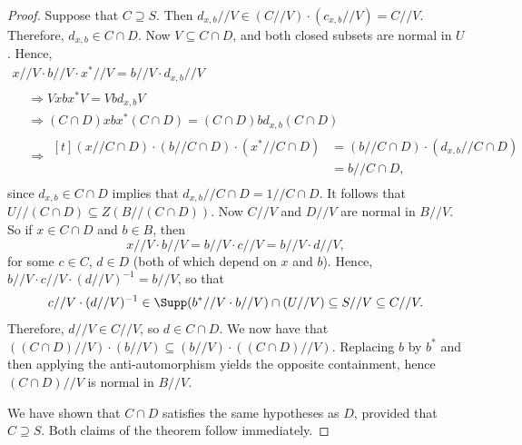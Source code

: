 \begin{proof}
Suppose that $C \supseteq S$. Then $d_{x,b}//V \in (C//V)\cdot
(c_{x,b}//V) 
= C//V$. Therefore, $d_{x,b} \in C\cap D$. Now $V \subseteq C\cap D$,
and both closed subsets are normal in $U$. Hence,
\begin{multline*}
x//V\cdot b//V\cdot x^*//V = b//V\cdot d_{x,b}//V\\ 
\begin{aligned}
&\Rightarrow 
Vxbx^*V = Vbd_{x,b}V
\\
 &\Rightarrow (C\cap D)xbx^*(C\cap D) = (C\cap
D)bd_{x,b}(C\cap D)
\\
& \Rightarrow\begin{aligned}[t](x//C\cap D)\cdot (b//C\cap D)\cdot
(x^*//C\cap D) &= (b//C\cap D)\cdot (d_{x,b}//C\cap D)\\
 &= b//C\cap D,
 \end{aligned}
\end{aligned}
\end{multline*}
since $d_{x,b} \in C\cap D$ implies that $d_{x,b}//C\cap D = 1//C\cap
D$. It follows that $U//(C\cap D) \subseteq Z(B//(C\cap D))$. 
Now 
 $C//V$ and $D//V$ are normal in $B//V$. 
 So if $x \in C\cap
D$ and $b \in B$, then 
\[
x//V\cdot b//V = b//V\cdot c//V = b//V\cdot d//V,
\]
for some $c \in C$, $d \in D$ (both of which depend on $x$ and $b$).
Hence, $b//V\cdot c//V\cdot (d//V)^{-1} = b//V$, so that 
\[
 c//V\cdot (d//V)^{-1} \in \Supp (b^*//V\cdot b//V)\cap (U//V) \subseteq S//V
\subseteq C//V.
\]
Therefore, $d//V \in C//V$, so $d \in C\cap D$. We now have that
$((C\cap D)//V)\cdot (b//V) \subseteq (b//V)\cdot ((C\cap D)//V)$. Replacing
$b$ by $b^*$ and then applying the anti-automorphism yields the opposite
containment, hence $(C\cap D)//V$ is normal in $B//V$. 

We have shown
that $C\cap D$ satisfies the same hypotheses as $D$, provided that $C
\supseteq S$. Both claims of the theorem follow immediately. 
\end{proof}
